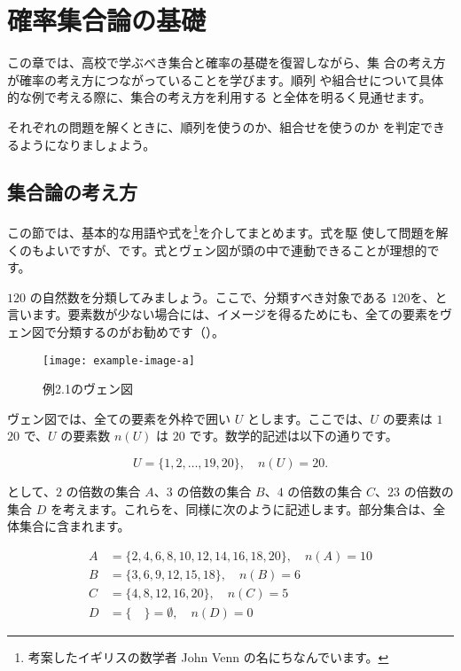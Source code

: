 \chapter{確率集合論の基礎}

\begin{chapintro}
    この章では、高校で学ぶべき集合と確率の基礎を復習しながら、集
    合の考え方が確率の考え方につながっていることを学びます。順列
    や組合せについて具体的な例で考える際に、集合の考え方を利用する
    と全体を明るく見通せます。
    
    それぞれの問題を解くときに、順列を使うのか、組合せを使うのか
    を判定できるようになりましょよう。
\end{chapintro}

\section{集合論の考え方}
この節では、基本的な用語や式を\footnote{考案したイギリスの数学者 John Venn の名にちなんでいます。}を介してまとめます。式を駆 使して問題を解くのもよいですが、です。式とヴェン図が頭の中で連動できることが理想的です。

\extitle{} $1$\tildeto$20$ の自然数を分類してみましょう。ここで、分類すべき対象である $1$\tildeto$20$を、と言います。要素数が少ない場合には、イメージを得るためにも、全ての要素をヴェン図で分類するのがお勧めです（{}）。

\begin{figure}[ht]
    \centering
    \texttt{[image: example-image-a]}
    \caption{例2.1のヴェン図\label{fig:ex2.1}}
\end{figure}

ヴェン図では、全ての要素を外枠で囲い $U$ とします。ここでは、$U$ の要素は $1$\tildeto$20$ で、$U$ の要素数 $n(U)$ は $20$ です。数学的記述は以下の通りです。

\begin{equation*}
    U=\{1,2,\ldots,19,20\},\quad n(U)=20.
\end{equation*}

として、$2$ の倍数の集合 $A$、$3$ の倍数の集合 $B$、$4$ の倍数の集合 $C$、$23$ の倍数の集合 $D$ を考えます。これらを、同様に次のように記述します。部分集合は、全体集合に含まれます。

\begin{align*}
    A &= \{2, 4, 6, 8, 10, 12, 14, 16, 18, 20\},\quad n(A) = 10\\
    B &= \{3, 6, 9, 12, 15, 18\},\quad n(B) = 6\\
    C &= \{4, 8, 12, 16, 20\},\quad n(C) = 5 \\
    D &= \{\quad\} = \emptyset,\quad n(D) = 0
\end{align*}

